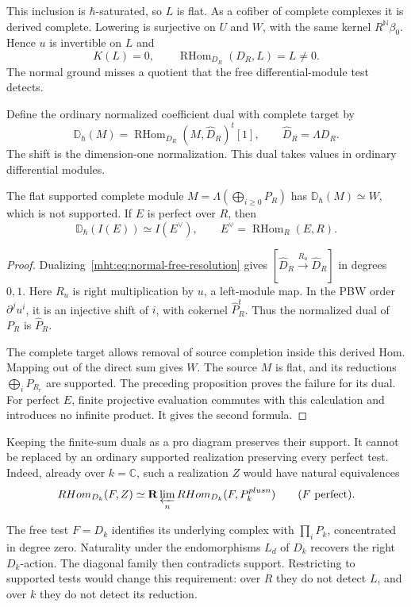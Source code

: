 This inclusion is $\hbar$-saturated, so $L$ is flat. As a
cofiber of complete complexes it is derived complete.
Lowering is surjective on $U$ and $W$, with the same kernel
$R^{\mathbb N}\beta_0$. Hence $u$ is invertible on $L$ and
\[
 K(L)=0,\qquad\operatorname{RHom}_{D_R}(D_R,L)=L\ne0.
\]
The normal ground misses a quotient that the free
differential-module test detects.

Define the ordinary normalized coefficient dual with
complete target by
\[
 \mathbb D_\hbar(M)=
       \operatorname{RHom}_{D_R}(M,\widehat D_R)^t[1],
 \qquad \widehat D_R=\Lambda D_R.
\]
The shift is the dimension-one normalization.
This dual takes values in ordinary differential modules.

\begin{proposition}\label{mht:prop:normal-realized-dual}
The flat supported complete module
$M=\Lambda(\bigoplus_{i\geq0}P_R)$ has
$\mathbb D_\hbar(M)\simeq W$, which is not supported.
If $E$ is perfect over $R$, then
\[
 \mathbb D_\hbar(I(E))\simeq I(E^\vee),
 \qquad E^\vee=\operatorname{RHom}_R(E,R).
\]
\end{proposition}
\begin{proof}
Dualizing~\eqref{mht:eq:normal-free-resolution} gives
$[\widehat D_R\xrightarrow{R_u}\widehat D_R]$ in degrees
$0,1$. Here $R_u$ is right multiplication by $u$, a
left-module map. In the PBW order $\partial^ju^i$, it
is an injective shift of $i$, with cokernel
$\widehat P_R^t$. Thus the normalized dual of $P_R$
is $\widehat P_R$.

The complete target allows removal of source completion
inside this derived Hom. Mapping out of the direct sum
gives $W$. The source $M$ is flat, and its reductions
$\bigoplus_iP_{R_r}$ are supported. The preceding
proposition proves the failure for its dual.
For perfect $E$, finite projective evaluation commutes
with this calculation and introduces no infinite product.
It gives the second formula.
\end{proof}

Keeping the finite-sum duals as a pro diagram preserves
their support. It cannot be replaced by an ordinary
supported realization preserving every perfect test.
Indeed, already over $k=\mathbb C$, such a realization
$Z$ would have natural equivalences
\[
 \operatorname{RHom}_{D_k}(F,Z)\simeq
 \mathbf R\varprojlim_n
             \operatorname{RHom}_{D_k}(F,P_k^{\oplus n})
 \qquad(F\text{ perfect}).
\]

The free test $F=D_k$ identifies its underlying complex
with $\prod_iP_k$, concentrated in degree zero.
Naturality under the endomorphisms $L_d$ of $D_k$
recovers the right $D_k$-action. The diagonal family
then contradicts support. Restricting to supported tests
would change this requirement: over $R$ they do not detect
$L$, and over $k$ they do not detect its reduction.


